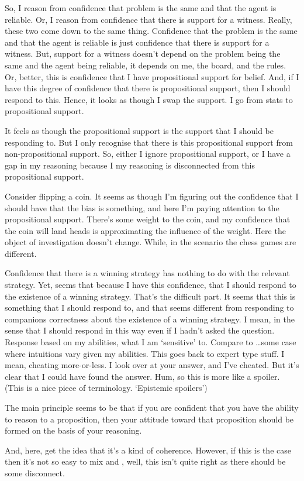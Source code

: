 \documentclass[10pt]{article}
\begin{document}
So, I reason from confidence that problem is the same and that the agent is reliable.
Or, I reason from confidence that there is support for a witness.
Really, these two come down to the same thing.
Confidence that the problem is the same and that the agent is reliable is just confidence that there is support for a witness.
But, support for a witness doesn't depend on the problem being the same and the agent being reliable, it depends on me, the board, and the rules.
Or, better, this is confidence that I have propositional support for belief.
And, if I have this degree of confidence that there is propositional support, then I should respond to this.
Hence, it looks as though I swap the support.
I go from stats to propositional support.

It feels as though the propositional support is the support that I should be responding to.
But I only recognise that there is this propositional support from non-propositional support.
So, either I ignore propositional support, or I have a gap in my reasoning because I my reasoning is disconnected from this propositional support.

Consider flipping a coin.
It seems as though I'm figuring out the confidence that I should have that the bias is something, and here I'm paying attention to the propositional support.
There's some weight to the coin, and my confidence that the coin will land heads is approximating the influence of the weight.
Here the object of investigation doesn't change.
While, in the scenario the chess games are different.

Confidence that there is a winning strategy has nothing to do with the relevant strategy.
Yet, seems that because I have this confidence, that I should respond to the existence of a winning strategy.
That's the difficult part.
It seems that this is something that I should respond to, and that seems different from responding to companions correctness about the existence of a winning strategy.
I mean, in the sense that I should respond in this way even if I hadn't asked the question.
Response based on my abilities, what I am `sensitive' to.
Compare to \dots some case where intuitions vary given my abilities.
This goes back to expert type stuff.
I mean, cheating more-or-less.
I look over at your answer, and I've cheated.
But it's clear that I could have found the answer.
Hum, so this is more like a spoiler.
(This is a nice piece of terminology. `Epistemic spoilers')




\begin{note}
  The main principle seems to be that if you are confident that you have the ability to reason to a proposition, then your attitude toward that proposition should be formed on the basis of your reasoning.

  And, here, get the idea that it's a kind of coherence.
  However, if this is the case then it's not so easy to mix \citeauthor{Lord:2017aa} and \textcite{Silva:2020aa}, well, this isn't quite right as there should be some disconnect.
\end{note}
\end{document}
